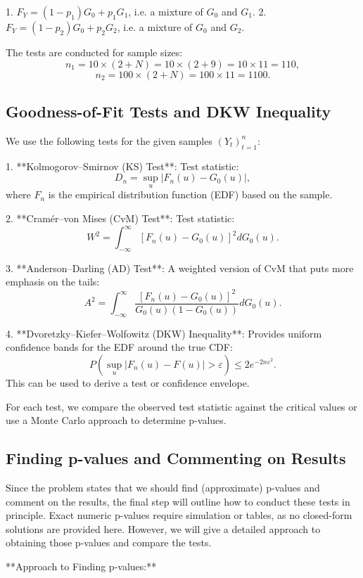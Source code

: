 \documentclass{article}
\begin{document}
1. \(F_Y = (1-p_1)G_0 + p_1 G_1\), i.e. a mixture of \(G_0\) and \(G_1\).
2. \(F_Y = (1-p_2)G_0 + p_2 G_2\), i.e. a mixture of \(G_0\) and \(G_2\).

The tests are conducted for sample sizes:
\[
n_1 = 10 \times (2+N) = 10 \times (2+9) = 10 \times 11 = 110,
\]
\[
n_2 = 100 \times (2+N) = 100 \times 11 = 1100.
\]

\subsection{Goodness-of-Fit Tests and DKW Inequality}

We use the following tests for the given samples \((Y_t)_{t=1}^n\):

1. **Kolmogorov–Smirnov (KS) Test**:  
   Test statistic:
   \[
   D_n = \sup_u |F_n(u) - G_0(u)|,
   \]
   where \(F_n\) is the empirical distribution function (EDF) based on the sample.

2. **Cramér–von Mises (CvM) Test**:  
   Test statistic:
   \[
   W^2 = \int_{-\infty}^{\infty} [F_n(u)-G_0(u)]^2 dG_0(u).
   \]

3. **Anderson–Darling (AD) Test**:  
   A weighted version of CvM that puts more emphasis on the tails:
   \[
   A^2 = \int_{-\infty}^{\infty} \frac{[F_n(u)-G_0(u)]^2}{G_0(u)(1-G_0(u))} dG_0(u).
   \]

4. **Dvoretzky–Kiefer–Wolfowitz (DKW) Inequality**:  
   Provides uniform confidence bands for the EDF around the true CDF:
   \[
   P\left(\sup_u |F_n(u)-F(u)| > \varepsilon\right) \le 2e^{-2n\varepsilon^2}.
   \]
   This can be used to derive a test or confidence envelope.

For each test, we compare the observed test statistic against the critical values or use a Monte Carlo approach to determine p-values.

\subsection{Finding p-values and Commenting on Results}

Since the problem states that we should find (approximate) p-values and comment on the results, the final step will outline how to conduct these tests in principle. Exact numeric p-values require simulation or tables, as no closed-form solutions are provided here. However, we will give a detailed approach to obtaining those p-values and compare the tests.

**Approach to Finding p-values:**
\end{document}
